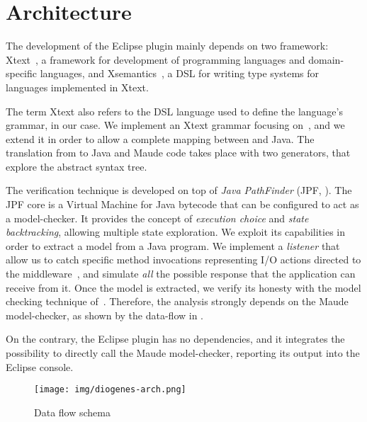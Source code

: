 \section{Architecture}

The development of the Eclipse plugin mainly depends on
two framework: Xtext~\cite{xtext-site}, a framework for 
development of programming languages and domain-specific languages, and
Xsemantics~\cite{xsemantics-site}, a DSL for writing type systems
for languages implemented in Xtext.

The term Xtext also refers to the DSL language
used to define the language's grammar, \coco in our case.
We implement an Xtext grammar focusing on~\cite{verifiable},
and we extend it
in order to allow a complete mapping between \coco and Java.
%
The translation from \coco to Java and Maude code
takes place with two generators, that explore the abstract syntax tree. 

The verification technique is developed on top of \emph{Java PathFinder}
(JPF, \cite{lerda2001addressing,visser2003model}).
The JPF core is a Virtual Machine for Java bytecode
that can be configured to act as a model-checker.
It provides the concept of \emph{execution choice}
and \emph{state backtracking}, allowing multiple state exploration.
%
We exploit its capabilities in order to extract a \coco model
from a Java program. We implement a \emph{listener} that allow us
to catch specific method invocations representing I/O actions
directed to the middleware~\cite{CO2middleware},
and simulate \emph{all} the possible response that 
the application can receive from it.
Once the \coco model is extracted, we verify its honesty
with the model checking technique of~\cite{verifiable}.
Therefore, the analysis strongly depends on the Maude model-checker,
as shown by the data-flow in .

On the contrary, the Eclipse plugin has no dependencies, and
it integrates the possibility to directly call 
the Maude model-checker, reporting its output into the Eclipse console.

\begin{figure}[t]
    \texttt{[image: img/diogenes-arch.png]}
    \caption{Data flow schema}
    \label{fig:data-flow}
\end{figure}
